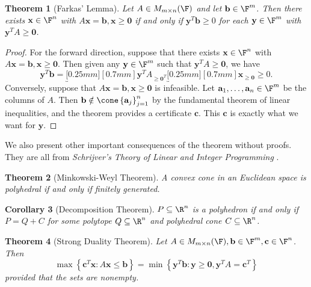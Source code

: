 \documentclass{article}
\newtheorem{theorem}{Theorem}
\newtheorem{cor}[theorem]{Corollary}
\renewcommand{\underbrace}{\underbracket[0.25mm][0.7mm]}
\renewcommand{\vec}{\mathbf}
\begin{document}
\begin{theorem}[Farkas' Lemma]
    Let $A\in M_{m\times n}(\F) $ and let $\vec{b}\in\F^m$. Then there exists $\vec{x}\in\F^n$ with $A\vec{x}=\vec{b}, \vec{x}\geq\vec{0}$ if and only if $\vec{y}^{T} \vec{b}\geq 0$ for each $\vec{y}\in\F^m$ with $\vec{y}^{T} A\geq \vec{0}$.
\end{theorem}
\begin{proof}
    For the forward direction, suppose that there exists $\vec{x}\in\F^n$ with $A\vec{x}=\vec{b},\vec{x}\geq\vec{0}$. Then given any $\vec{y}\in\F^m$ such that $\vec{y}^{T} A\geq \vec{0}$, we have
    \begin{equation*}
        \vec{y}^{T} \vec{b} = \underbrace{\vec{y}^{T} A}_{\geq\vec{0}^{T} }\underbrace{\vec{x}}_{\geq\vec{0}} \geq 0.
    \end{equation*}
    Conversely, suppose that $A\vec{x}=\vec{b}, \vec{x}\geq\vec{0}$ is infeasible. Let $\vec{a}_1,\ldots,\vec{a}_n\in\F^m$ be the columns of $A$. Then $\vec{b}\notin\cone\left\lbrace \vec{a}_{j} \right\rbrace^{n}_{j=1}$ by the fundamental theorem of linear inequalities, and the theorem provides a certificate $\vec{c}$. This $\vec{c}$ is exactly what we want for $\vec{y}$.
\end{proof}

We also present other important consequences of the theorem without proofs. They are all from \textit{Schrijver's Theory of Linear and Integer Programming} \cite{TLIP}.

\begin{theorem}[Minkowski-Weyl Theorem]
    A convex cone in an Euclidean space is polyhedral if and only if finitely generated.
\end{theorem}

\begin{cor}[Decomposition Theorem]
    $P\subseteq\R^n$ is a polyhedron if and only if $P=Q+C$ for some polytope $Q\subseteq\R^n$ and polyhedral cone $C\subseteq\R^n$.
\end{cor}	

\begin{theorem}[Strong Duality Theorem]
    Let $A\in M_{m\times n}(\F), \vec{b}\in\F^m, \vec{c}\in\F^n$. Then
    \begin{equation*}
        \max\left\lbrace \vec{c}^{T} \vec{x}:A\vec{x}\leq\vec{b} \right\rbrace = \min\left\lbrace \vec{y}^{T} \vec{b}:\vec{y}\geq\vec{0},\vec{y}^{T} A=\vec{c}^{T}  \right\rbrace 
    \end{equation*}
    provided that the sets are nonempty.
\end{theorem}
\end{document}
